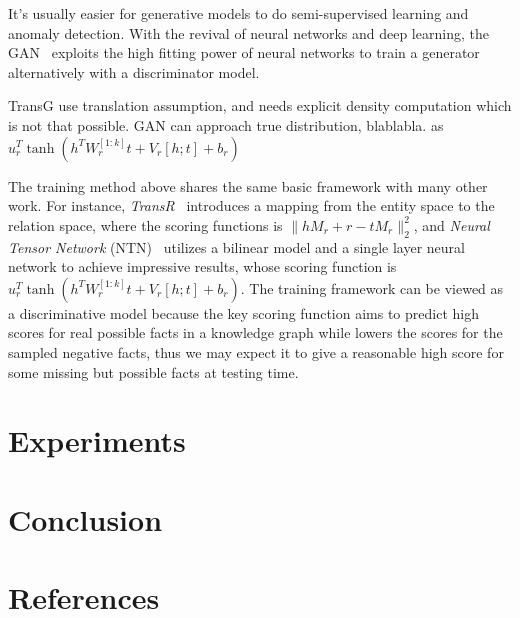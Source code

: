 \documentclass[twocolumn,a4paper,10pt,review,5p]{elsarticle}
\begin{document}
It's usually easier for generative models to do semi-supervised learning and anomaly detection. With the revival of neural networks and deep learning, the GAN~\cite{GAN} exploits the high fitting power of neural networks to train a generator alternatively with a discriminator model.

TransG use translation assumption, and needs explicit density computation which is not that possible.
GAN can approach true distribution, blablabla.  as $u_r^T \tanh(h^T W_r^{[1:k]}t + V_r[h;t] + b_r)$



The training method above shares the same basic framework with many other work. For instance, \emph{TransR}~\cite{TransR2015} introduces a mapping from the entity space to the relation space, where the scoring functions is $\lVert h M_r + r - t M_r \rVert_2^2 $, and \emph{Neural Tensor Network} (NTN)~\cite{NTN} utilizes a bilinear model and a single layer neural network to achieve impressive results, whose scoring function is $u_r^T \tanh(h^T W_r^{[1:k]}t + V_r[h;t] + b_r)$. The training framework can be viewed as a discriminative model because the key scoring function aims to predict high scores for real possible facts in a knowledge graph while lowers the scores for the sampled negative facts, thus we may expect it to give a reasonable high score for some missing but possible facts at testing time.


\section{Experiments}


\section{Conclusion}

\section*{References}


\end{document}
